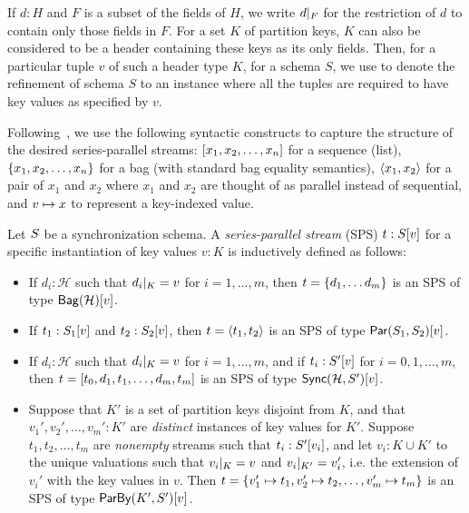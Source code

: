 If $d : H$ and $F$ is a subset of the fields of $H$, we write $\tuprestrict{d}{F}$ for
the restriction of $d$ to contain only those fields in $F$.
For a set $K$ of partition keys, $K$ can also be considered to be a header containing these keys as its only fields.
Then, for a particular tuple $v$ of such a header type $K$, for a schema $S$, we use
 to denote the refinement of schema $S$ to an instance where all the tuples
are required to have key values as specified by $v$.

Following~, we use the following syntactic constructs to capture the structure of the desired series-parallel streams: $\spsseq{x_1, x_2, \ldots, x_n}$ for
a sequence (list), $\spsbag{x_1, x_2, \ldots, x_n}$ for a bag (with standard bag
equality semantics), $\spspargen{x_1, x_2}$ for a pair of $x_1$ and $x_2$ where
$x_1$ and $x_2$ are thought of as parallel instead of sequential,
and $\keyed{v}{x}$ to represent a key-indexed value.

\begin{definition}
\label{45:def:trace}
Let $\ss$ be a synchronization schema.
A \emph{series-parallel stream} (SPS) $t : \spstype{v}{\ss}$ for a specific instantiation of key values $v : K$ is inductively defined as follows:
\begin{itemize}
\item
If $d_i : \mathcal{H}$ such that $\tuprestrict{d_i}{K} = v$
for $i = 1, \ldots, m$,
then $t = \spsbag{d_1, \ldots d_m}$
is an SPS of type $\spstype{v}{\relleaf{\mathcal{H}}}$.
\item
If $t_1 : \spstype{v}{S_1}$
and $t_2 : \spstype{v}{S_2}$,
then $t = \spspar{t_1}{t_2}$
is an SPS of type $\spstype{v}{\parcomp{S_1}{S_2}}$.
\item
If $d_i : \mathcal{H}$ such that $\tuprestrict{d_i}{K} = v$
for $i = 1, \ldots, m$,
and if $t_i: \spstype{v}{S'}$ for $i = 0, 1, \ldots, m$,
then
$t = \spsseq{t_0, d_1, t_1, \ldots, d_m, t_m}$
is an SPS of type $\spstype{v}{\hier{\mathcal{H}}{S'}}$.
\item
Suppose that $K'$ is a set of partition keys disjoint from $K$,
and that $v_1', v_2', \ldots, v_m': K'$ are \emph{distinct} instances
of key values for $K'$.
Suppose $t_1, t_2, \ldots, t_m$ are \emph{nonempty} streams such that
$t_i: \spstype{v_i}{S'}$,
and let $v_i: K \cup K'$ to the unique valuations
such that $\tuprestrict{v_i}{K} = v$ and $\tuprestrict{v_i}{K'} = v_i'$,
i.e. the extension of $v_i'$ with the key values in $v$.
Then
$t = \spsbag{\keyed{v_1'}{t_1}, \keyed{v_2'}{t_2}, \ldots, \keyed{v_m'}{t_m}}$
is an SPS of type
$\spstype{v}{\keyby{K'}{S'}}$.
\end{itemize}
\end{definition}

